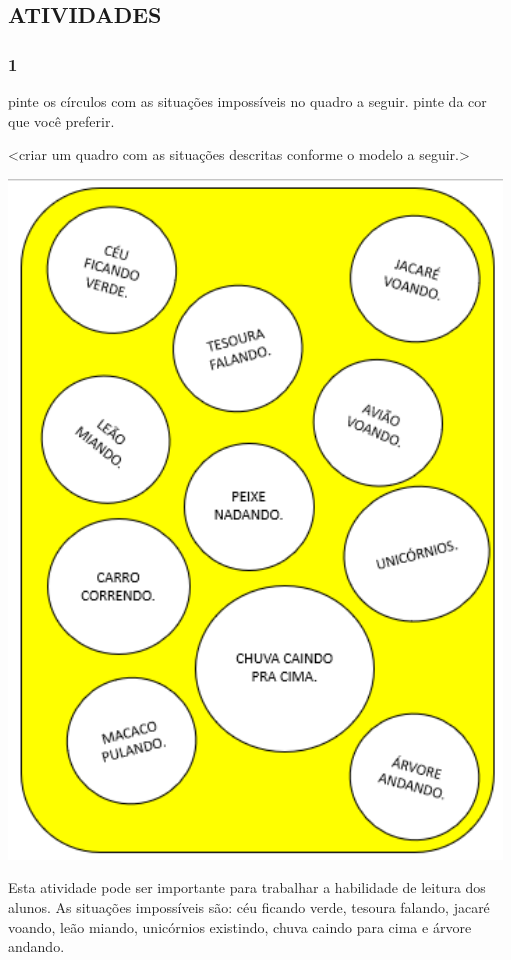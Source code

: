 \subsection{ATIVIDADES}\label{atividades-5}

\subsubsection{1}\label{section-63}

pinte os círculos com as situações impossíveis no quadro a seguir. pinte
da cor que você preferir.

\textless{}criar um quadro com as situações descritas conforme o modelo
a seguir.\textgreater{}

\includegraphics[width=5.16074in,height=7.09420in]{media/image80.png}

Esta atividade pode ser importante para trabalhar a
habilidade de leitura dos alunos. As situações impossíveis são: céu
ficando verde, tesoura falando, jacaré voando, leão miando, unicórnios existindo,
chuva caindo para cima e árvore andando.

